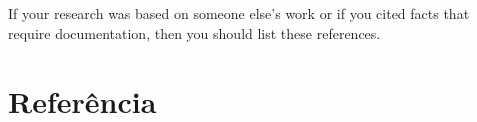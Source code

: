 

If your research was based on someone else's work or if you cited facts that require documentation, then you should list these references.

\section{Referência}
\label{references}


